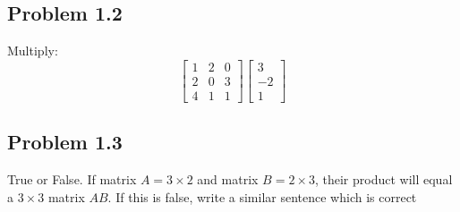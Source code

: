 \documentclass[12pt]{article}
\begin{document}
\subsection{Problem 1.2}\label{p1.2}
\begin{tcolorbox}[title=Problem 1.2]
Multiply: \begin{equation*}
  \begin{bmatrix}
    1 & 2 & 0\\
    2 & 0 & 3\\
    4 & 1 & 1
  \end{bmatrix}
  \begin{bmatrix}
  3\\
  -2\\
  1
  \end{bmatrix}
\end{equation*}
\end{tcolorbox}

\subsection{Problem 1.3}\label{p1.3}
\begin{tcolorbox}[title=Problem 1.3]
True or False. If matrix $ A = 3 \times 2 $ and matrix $ B = 2 \times 3 $, their product will equal a $ 3 \times 3 $ matrix $ AB $. If this is false, write a similar sentence which is correct
\end{tcolorbox}
\end{document}

